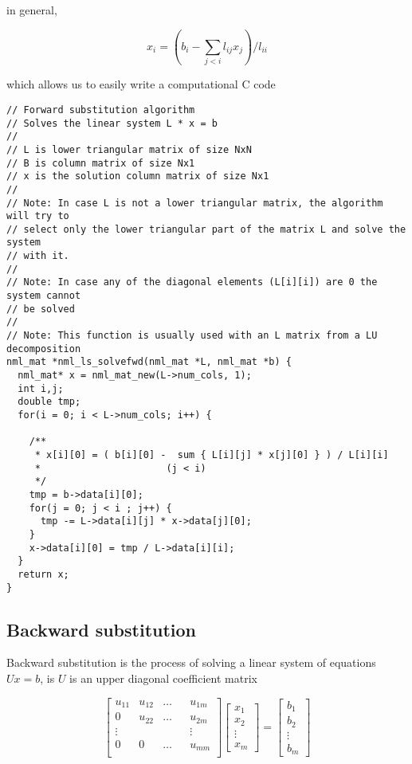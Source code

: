in general,

$$
x_i = \left( b_i - \sum_{j<i} l_{ij}x_j \right) / l_{ii}
$$

which allows us to easily write a computational C code

\begin{verbatim}
// Forward substitution algorithm
// Solves the linear system L * x = b
//
// L is lower triangular matrix of size NxN
// B is column matrix of size Nx1
// x is the solution column matrix of size Nx1
//
// Note: In case L is not a lower triangular matrix, the algorithm will try to
// select only the lower triangular part of the matrix L and solve the system
// with it.
//
// Note: In case any of the diagonal elements (L[i][i]) are 0 the system cannot
// be solved
//
// Note: This function is usually used with an L matrix from a LU decomposition
nml_mat *nml_ls_solvefwd(nml_mat *L, nml_mat *b) {
  nml_mat* x = nml_mat_new(L->num_cols, 1);
  int i,j;
  double tmp;
  for(i = 0; i < L->num_cols; i++) {
  
    /**
     * x[i][0] = ( b[i][0] -  sum { L[i][j] * x[j][0] } ) / L[i][i]
     *                      (j < i)
     */
    tmp = b->data[i][0];
    for(j = 0; j < i ; j++) {
      tmp -= L->data[i][j] * x->data[j][0];
    }
    x->data[i][0] = tmp / L->data[i][i];
  }
  return x;
}
\end{verbatim}

\subsection{Backward substitution}

Backward substitution is the process of solving a linear system of equations $Ux = b$, is $U$ is an upper diagonal coefficient matrix

$$
\begin{bmatrix}
u_{11} & u_{12} & \ldots && u_{1m} \\
0 & u_{22} & \ldots && u_{2m} \\
\vdots & & & & \vdots \\
0 & 0 & \ldots && u_{mm} \\
\end{bmatrix}
\begin{bmatrix}
x_{1} \\
x_{2} \\
\vdots   \\
x_{m}
\end{bmatrix}
=
\begin{bmatrix}
b_{1} \\
b_{2} \\
\vdots \\
b_{m}
\end{bmatrix}
$$

